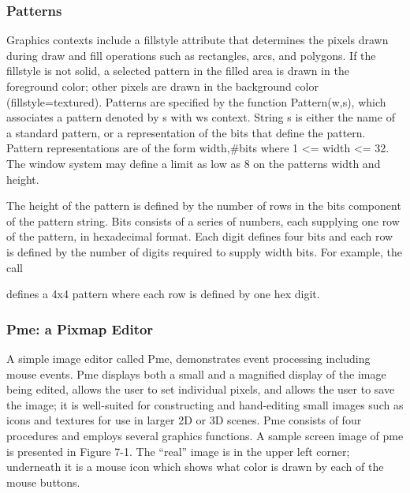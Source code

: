 \subsubsection{Patterns}

Graphics contexts include a fillstyle attribute that determines the
pixels drawn during draw and fill operations such as rectangles, arcs,
and polygons. If the fillstyle is not solid, a selected pattern in
the filled area is drawn in the foreground color; other pixels are
drawn in the background color
({\textquotedbl}fillstyle=textured{\textquotedbl}). Patterns are
specified by the function Pattern(w,s), which associates a pattern
denoted by s with w{\textquotesingle}s context. String s is either
the name of a standard pattern, or a representation of the bits that
define the pattern. Pattern representations are of the form
{\textquotedbl}width,\#bits{\textquotedbl} where 1 {\textless}= width
{\textless}= 32. The window system may define a limit as low as 8 on
the pattern{\textquotesingle}s width and height.

The height of the pattern is defined by the number of rows in the bits
component of the pattern string. Bits consists of a series of
numbers, each supplying one row of the pattern, in hexadecimal format.
Each digit defines four bits and each row is defined by the number of
digits required to supply width bits. For example, the call


\noindent defines a 4x4 pattern where each row is defined by one hex digit.

\subsubsection{Pme: a Pixmap Editor}

A simple image editor called Pme, demonstrates event processing
including mouse events. Pme displays both a small and a
{\textquotedbl}magnified{\textquotedbl} display of the image being
edited, allows the user to set individual pixels, and allows the user
to save the image; it is well-suited for constructing and hand-editing
small images such as icons and textures for use in larger 2D or 3D
scenes. Pme consists of four procedures and employs several graphics
functions. A sample screen image of pme is presented in Figure 7-1. The
{\textquotedblleft}real{\textquotedblright} image is in the upper left
corner; underneath it is a mouse icon which shows what color is drawn
by each of the mouse buttons.



